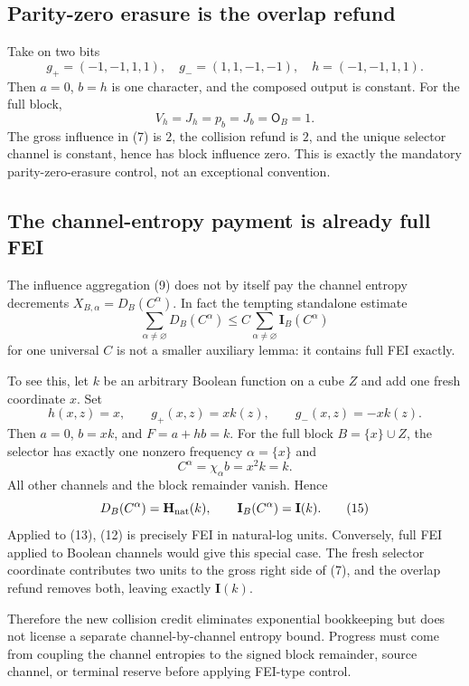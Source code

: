\subsection*{Parity-zero erasure is the overlap refund}

Take on two bits
\[
 g_+=(-1,-1,1,1),\quad g_-=(1,1,-1,-1),\quad
 h=(-1,-1,1,1).
\tag{11}
\]
Then $a=0$, $b=h$ is one character, and the composed output is constant.
For the full block,
\[
 V_h=J_h=p_b=J_b=\mathsf O_B=1.
\]
The gross influence in (7) is $2$, the collision refund is $2$, and the
unique selector channel is constant, hence has block influence zero.  This
is exactly the mandatory parity-zero-erasure control, not an exceptional
convention.

\subsection*{The channel-entropy payment is already full FEI}

The influence aggregation (9) does not by itself pay the channel entropy
decrements $X_{B,\alpha}=D_B(C^\alpha)$.  In fact the tempting standalone
estimate
\[
 \sum_{\alpha\ne\varnothing}D_B(C^\alpha)
 \le C\sum_{\alpha\ne\varnothing}\mathbf I_B(C^\alpha)
\tag{12}
\]
for one universal $C$ is not a smaller auxiliary lemma: it contains full FEI
exactly.

To see this, let $k$ be an arbitrary Boolean function on a cube $Z$ and add
one fresh coordinate $x$.  Set
\[
 h(x,z)=x,\qquad g_+(x,z)=xk(z),\qquad
 g_-(x,z)=-xk(z).
\tag{13}
\]
Then $a=0$, $b=xk$, and $F=a+hb=k$.  For the full block
$B=\{x\}\cup Z$, the selector has exactly one nonzero frequency
$\alpha=\{x\}$ and
\[
 C^\alpha=\chi_\alpha b=x^2k=k.
\tag{14}
\]
All other channels and the block remainder vanish.  Hence
\[
 D_B(C^\alpha)=\mathbf H_{\rm nat}(k),\qquad
 \mathbf I_B(C^\alpha)=\mathbf I(k).
\tag{15}
\]
Applied to (13), (12) is precisely FEI in natural-log units.  Conversely,
full FEI applied to Boolean channels would give this special case.  The
fresh selector coordinate contributes two units to the gross right side of
(7), and the overlap refund removes both, leaving exactly $\mathbf I(k)$.

Therefore the new collision credit eliminates exponential bookkeeping but
does not license a separate channel-by-channel entropy bound.  Progress must
come from coupling the channel entropies to the signed block remainder,
source channel, or terminal reserve before applying FEI-type control.
